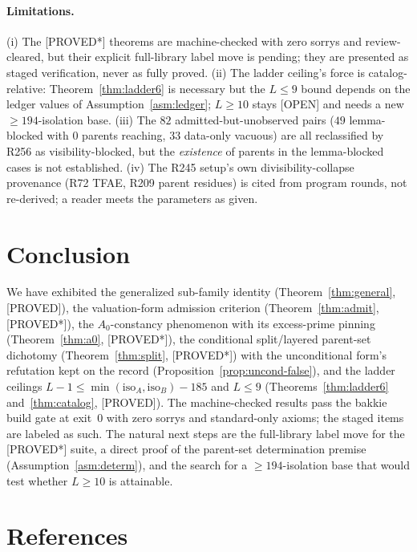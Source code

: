\documentclass[11pt,a4paper]{article}
\theoremstyle{definition}
\begin{document}
\paragraph{Limitations.} (i) The [PROVED*] theorems are machine-checked
with zero sorrys and review-cleared, but their explicit full-library
label move is pending; they are presented as staged verification,
never as fully proved. (ii) The ladder ceiling's force is
catalog-relative: Theorem~\ref{thm:ladder6} is necessary but the
$L\le9$ bound depends on the ledger values of Assumption~\ref{asm:ledger};
$L\ge10$ stays [OPEN] and needs a new $\ge194$-isolation base. (iii)
The $82$ admitted-but-unobserved pairs ($49$ lemma-blocked with $0$
parents reaching, $33$ data-only vacuous) are all reclassified by R256
as visibility-blocked, but the \emph{existence} of parents in the
lemma-blocked cases is not established. (iv) The R245 setup's own
divisibility-collapse provenance (R72 TFAE, R209 parent residues) is
cited from program rounds, not re-derived; a reader meets the parameters
as given.

\section{Conclusion}

We have exhibited the generalized sub-family identity
(Theorem~\ref{thm:general}, [PROVED]), the valuation-form admission
criterion (Theorem~\ref{thm:admit}, [PROVED*]), the $A_0$-constancy
phenomenon with its excess-prime pinning (Theorem~\ref{thm:a0},
[PROVED*]), the conditional split/layered parent-set dichotomy
(Theorem~\ref{thm:split}, [PROVED*]) with the unconditional form's
refutation kept on the record (Proposition~\ref{prop:uncond-false}),
and the ladder ceilings $L-1\le\min(\mathrm{iso}_A,\mathrm{iso}_B)-185$
and $L\le9$ (Theorems~\ref{thm:ladder6} and~\ref{thm:catalog},
[PROVED]). The machine-checked results pass the bakkie build gate at
exit~$0$ with zero sorrys and standard-only axioms; the staged items
are labeled as such. The natural next steps are the full-library label
move for the [PROVED*] suite, a direct proof of the parent-set
determination premise (Assumption~\ref{asm:determ}), and the search for
a $\ge194$-isolation base that would test whether $L\ge10$ is
attainable.

\section{References}
\end{document}
